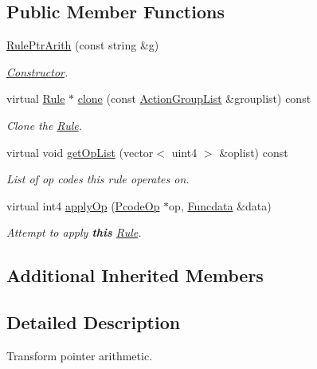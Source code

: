 \subsection*{Public Member Functions}
\begin{DoxyCompactItemize}
\item 
\mbox{\hyperlink{class_rule_ptr_arith_a139210db9ccd8becc85ce3ec5467f04a}{Rule\+Ptr\+Arith}} (const string \&g)
\begin{DoxyCompactList}\small\item\em \mbox{\hyperlink{class_constructor}{Constructor}}. \end{DoxyCompactList}\item 
virtual \mbox{\hyperlink{class_rule}{Rule}} $\ast$ \mbox{\hyperlink{class_rule_ptr_arith_afe0c04cbed0b86e6c09ca29f4514531f}{clone}} (const \mbox{\hyperlink{class_action_group_list}{Action\+Group\+List}} \&grouplist) const
\begin{DoxyCompactList}\small\item\em Clone the \mbox{\hyperlink{class_rule}{Rule}}. \end{DoxyCompactList}\item 
virtual void \mbox{\hyperlink{class_rule_ptr_arith_a1671af63d66f70ec2746887d32dfa46e}{get\+Op\+List}} (vector$<$ uint4 $>$ \&oplist) const
\begin{DoxyCompactList}\small\item\em List of op codes this rule operates on. \end{DoxyCompactList}\item 
virtual int4 \mbox{\hyperlink{class_rule_ptr_arith_a8b6d5d16ceb0884f97bebd712b9f6852}{apply\+Op}} (\mbox{\hyperlink{class_pcode_op}{Pcode\+Op}} $\ast$op, \mbox{\hyperlink{class_funcdata}{Funcdata}} \&data)
\begin{DoxyCompactList}\small\item\em Attempt to apply {\bfseries{this}} \mbox{\hyperlink{class_rule}{Rule}}. \end{DoxyCompactList}\end{DoxyCompactItemize}
\subsection*{Additional Inherited Members}


\subsection{Detailed Description}
Transform pointer arithmetic. 

